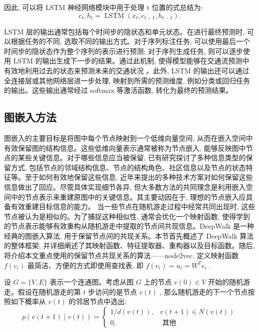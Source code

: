 因此, 可以将 LSTM 神经网络模块中用于处理 t 位置的式总结为:
\begin{equation}
{c}_{t}, {h}_{t} = \operatorname{LSTM}\left( {{x}_{t}, {c}_{t - 1}, {h}_{t - 1}}\right).
\end{equation}

LSTM 层的输出通常包括每个时间步的隐状态和单元状态。在进行最终预测时, 可以根据任务的不同, 选取不同的输出方式。对于序列标注任务, 可以使用最后一个时间步的隐状态作为整个序列的表示进行预测; 对于序列生成任务, 则可以逐步使用 LSTM 的输出生成下一步的结果。通过此机制, 使得模型能够在交通流预测中有效地利用过去的状态来预测未来的交通状况 \parencite{2022_刘建伟_循环神经网络研究综述}。此外, LSTM 的输出还可以通过全连接层或其他网络层进一步处理, 映射到所需的预测维度, 例如分类或回归任务的输出。这些输出通常经过 softmax 等激活函数, 转化为最终的预测结果。


\subsection{图嵌入方法}
图嵌入的主要目标是将图中每个节点映射到一个低维向量空间, 从而在嵌入空间中有效保留图的结构信息。这些低维向量表示通常被称为节点嵌入, 能够反映图中节点的某些关键信息。对于哪些信息应当被保留, 已有研究探讨了多种信息类型的保留方式, 包括节点的邻域结构信息、节点的结构角色、社区信息以及节点的状态特征等。至于如何有效地保留这些信息, 近年来提出的多种技术方案对如何保留这些信息做出了回应。尽管具体实现细节各异, 但大多数方法的共同理念是利用嵌入空间中的节点表示来重建原图中的关键信息。其主要动因在于, 理想的节点嵌入应具备有效重建目标信息的能力。
当一些节点在随机游走过程中经常共同出现时, 这些节点被认为是相似的。为了捕捉这种相似性, 通常会优化一个映射函数, 使得学到的节点表示能够有效重构从随机游走中提取的节点间共现信息。DeepWalk \parencite{2014_Perozzi_DeepWalk_Online_Learning_of_Social_Representations} 是一种经典的图嵌入算法, 用于保留节点间的共现关系。本节首先概述了 DeepWalk 算法的整体框架, 并详细阐述了其映射函数、特征提取器、重构器以及目标函数。随后, 将介绍本文重点使用的保留节点共现关系的算法——node2vec.
定义映射函数 \(f\left( {v}_{i}\right)\) 最简洁、方便的方式即使用查找表, 即 \(f\left( {v}_{i}\right)  = {u}_{i} = {W}^{T}{e}_{i}\) .

设 \({G} = \{ {V}, {E}\}\) 表示一个连通图。考虑从图 \({G}\) 上的节点 \({v}\left( 0\right)  \in  {V}\) 开始的随机游走。假设在随机游走的第 \({t}\) 步访问的是节点 \({v}\left( {t}\right)\) , 那么随机游走的下一个节点按照如下概率从 \({v}\left( {t}\right)\) 的邻居节点中选出:
\begin{equation}
p\left( {v\left( {t + 1}\right)  \mid  v\left( t\right) }\right)  = \left\{  \begin{matrix} 1/d\left( {v\left( t\right) }\right), & v\left( {t + 1}\right)  \in  N\left( {v\left( t\right) }\right) \\  0, & \text{ 其他 } \end{matrix}\right.
\end{equation}

